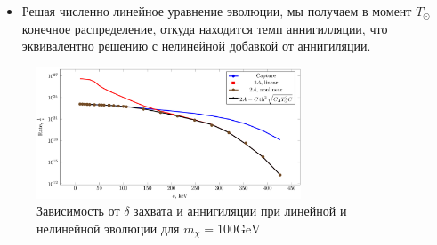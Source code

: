\begin{itemize}
	\item Решая численно линейное уравнение эволюции, мы получаем в момент $T_{\odot}$ конечное распределение, откуда находится темп аннигилляции, что эквивалентно решению с нелинейной добавкой от аннигиляции.
\end{itemize}


\begin{figure}[!h]
	\centering
	\includegraphics[width=0.7\textwidth]{images/LinearNonLinear.png}
	\caption{Зависимость от $\delta$ захвата и аннигиляции при линейной и нелинейной эволюции для $m_{\chi} = 100\text{GeV}$}
\end{figure}
